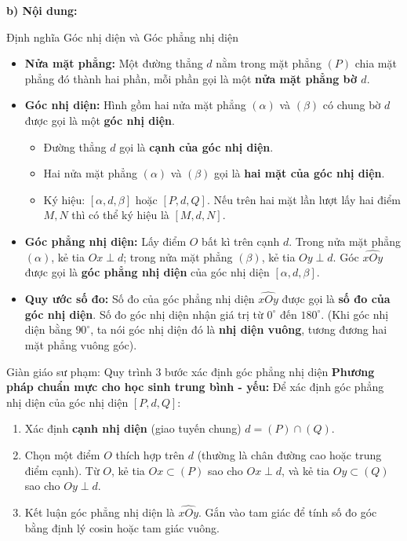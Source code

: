\documentclass[12pt, a4paper]{article}
\begin{document}
\noindent \textbf{b) Nội dung:}
\begin{pedabox}{Định nghĩa Góc nhị diện và Góc phẳng nhị diện}
\begin{itemize}[leftmargin=0.6cm]
    \item \textbf{Nửa mặt phẳng:} Một đường thẳng $d$ nằm trong mặt phẳng $(P)$ chia mặt phẳng đó thành hai phần, mỗi phần gọi là một \textbf{nửa mặt phẳng bờ $d$}.
    \item \textbf{Góc nhị diện:} Hình gồm hai nửa mặt phẳng $(\alpha)$ và $(\beta)$ có chung bờ $d$ được gọi là một \textbf{góc nhị diện}.
    \begin{itemize}
        \item Đường thẳng $d$ gọi là \textbf{cạnh của góc nhị diện}.
        \item Hai nửa mặt phẳng $(\alpha)$ và $(\beta)$ gọi là \textbf{hai mặt của góc nhị diện}.
        \item Ký hiệu: $[\alpha, d, \beta]$ hoặc $[P, d, Q]$. Nếu trên hai mặt lần lượt lấy hai điểm $M, N$ thì có thể ký hiệu là $[M, d, N]$.
    \end{itemize}
    \item \textbf{Góc phẳng nhị diện:} Lấy điểm $O$ bất kì trên cạnh $d$. Trong nửa mặt phẳng $(\alpha)$, kẻ tia $Ox \perp d$; trong nửa mặt phẳng $(\beta)$, kẻ tia $Oy \perp d$.
    Góc $\widehat{xOy}$ được gọi là \textbf{góc phẳng nhị diện} của góc nhị diện $[\alpha, d, \beta]$.
    \item \textbf{Quy ước số đo:} Số đo của góc phẳng nhị diện $\widehat{xOy}$ được gọi là \textbf{số đo của góc nhị diện}. Số đo góc nhị diện nhận giá trị từ $0^\circ$ đến $180^\circ$.
    (Khi góc nhị diện bằng $90^\circ$, ta nói góc nhị diện đó là \textbf{nhị diện vuông}, tương đương hai mặt phẳng vuông góc).
\end{itemize}
\end{pedabox}

\begin{scaffoldbox}{Giàn giáo sư phạm: Quy trình 3 bước xác định góc phẳng nhị diện}
\textbf{Phương pháp chuẩn mực cho học sinh trung bình - yếu:}
Để xác định góc phẳng nhị diện của góc nhị diện $[P, d, Q]$:
\begin{enumerate}[leftmargin=0.8cm]
    \item[\textbf{Bước 1:}] Xác định \textbf{cạnh nhị diện} (giao tuyến chung) $d = (P) \cap (Q)$.
    \item[\textbf{Bước 2:}] Chọn một điểm $O$ thích hợp trên $d$ (thường là chân đường cao hoặc trung điểm cạnh).
    Từ $O$, kẻ tia $Ox \subset (P)$ sao cho $Ox \perp d$, và kẻ tia $Oy \subset (Q)$ sao cho $Oy \perp d$.
    \item[\textbf{Bước 3:}] Kết luận góc phẳng nhị diện là $\widehat{xOy}$. Gắn vào tam giác để tính số đo góc bằng định lý cosin hoặc tam giác vuông.
\end{enumerate}
\end{scaffoldbox}
\end{document}

